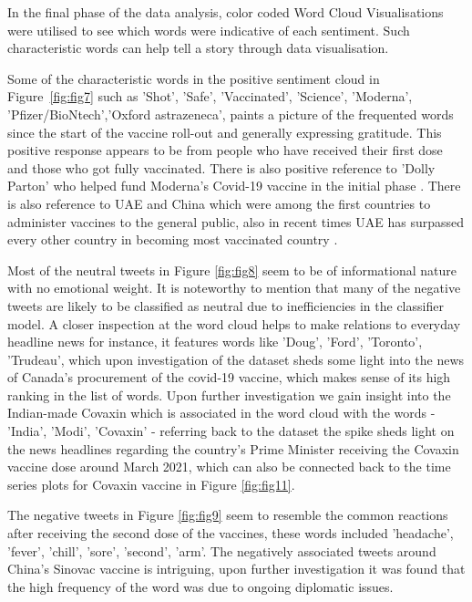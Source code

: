 \documentclass[conference]{IEEEtran}
\begin{document}
In the final phase of the data analysis, color coded Word Cloud Visualisations were utilised to see which words were indicative of each sentiment. Such characteristic words can help tell a story through data visualisation.

Some of the characteristic words in the positive sentiment cloud in Figure~\ref{fig:fig7}  such as 'Shot', 'Safe', 'Vaccinated', 'Science', 'Moderna', 'Pfizer/BioNtech','Oxford astrazeneca', paints a picture of the frequented words since the start of the vaccine roll-out and generally expressing gratitude. This positive response appears to be from people who have received their first dose and those who got fully vaccinated. There is also positive reference to 'Dolly Parton' who helped fund Moderna's Covid-19 vaccine in the initial phase \cite{sworld}. There is also reference to UAE and China which were among the first countries to administer vaccines to the general public, also in recent times UAE has surpassed every other country in becoming most vaccinated country \cite{pworld}. 

Most of the neutral tweets in Figure \ref{fig:fig8} seem to be of informational nature with no emotional weight. It is noteworthy to mention that many of the negative tweets are likely to be classified as neutral due to inefficiencies in the classifier model. A closer inspection at the word cloud helps to make relations to everyday headline news for instance, it features words like 'Doug', 'Ford', 'Toronto', 'Trudeau', which upon investigation of the dataset sheds some light into the news of Canada's procurement of the covid-19 vaccine, which makes sense of its high ranking in the list of words. Upon further investigation we gain insight into the Indian-made Covaxin which is associated in the word cloud with the words - 'India', 'Modi', 'Covaxin' - referring back to the dataset the spike sheds light on the news headlines regarding the country's Prime Minister receiving the Covaxin vaccine dose around March 2021, which can also be connected back to the time series plots for Covaxin vaccine in Figure \ref{fig:fig11}.  

The negative tweets in Figure \ref{fig:fig9} seem to resemble the common reactions after receiving the second dose of the vaccines, these words included 'headache', 'fever', 'chill', 'sore', 'second', 'arm'. The negatively associated tweets around China's Sinovac vaccine is intriguing, upon further investigation it was found that the high frequency of the word was due to ongoing diplomatic issues. 
\end{document}
